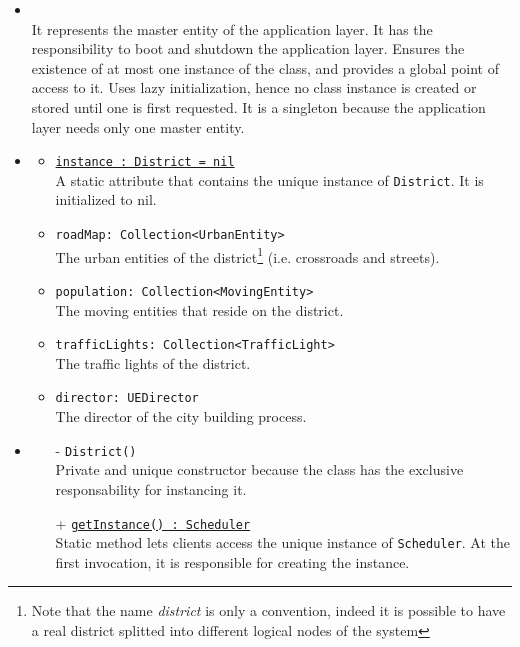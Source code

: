 \begin{itemize}
  \item \textbf{\descr} \\
  It represents the master entity of the application layer. 
  It has the responsibility to boot and shutdown the application layer.
  Ensures the existence of at most one instance of the class, 
  and provides a global point of access to it.
  Uses lazy initialization, hence no class instance is created 
  or stored until one is first requested.
  It is a singleton because the application layer needs 
  only one master entity.
  \item \textbf{\attrs}
  \begin{itemize}
    \item \texttt{\underline{instance : District = nil}} \\
    A static attribute that contains the unique instance of \texttt{District}.
    It is initialized to nil.
    \item \texttt{roadMap: Collection<UrbanEntity>} \\
    The urban entities of the district\footnote{Note that the name 
    \textit{district} is only a convention, indeed it is possible to have a 
    real district splitted into different logical nodes of the system}
    (i.e. crossroads and streets). 
    \item \texttt{population: Collection<MovingEntity>} \\
    The moving entities that reside on the district.
    \item \texttt{trafficLights: Collection<TrafficLight>} \\
    The traffic lights of the district.
    \item \texttt{director: UEDirector} \\ 
    The director of the city building process.
  \end{itemize}
  \item \textbf{\ops}
  \begin{itemize}
    \item[-] \texttt{District()} \\
    Private and unique constructor because the class has the exclusive 
    responsability for instancing it.
    \item[+] \texttt{\underline{getInstance() : Scheduler}} \\
    Static method lets clients access the unique instance 
    of \texttt{Scheduler}. At the first invocation, it is responsible 
    for creating the instance.

\end{itemize}
\end{itemize}
